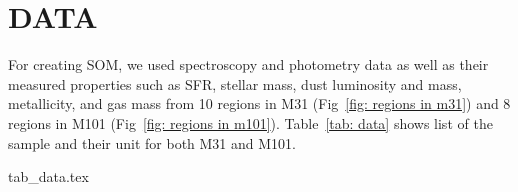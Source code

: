 
\section{DATA}

For creating SOM, we used spectroscopy and photometry data as well as their measured properties such as SFR, stellar mass, dust luminosity and mass, metallicity, and gas mass from 10 regions in M31 (Fig~\ref{fig: regions in m31}) and 8 regions in M101 (Fig~\ref{fig: regions in m101}).
Table~\ref{tab: data} shows list of the sample and their unit for both M31 and M101.

{tab_data.tex}

